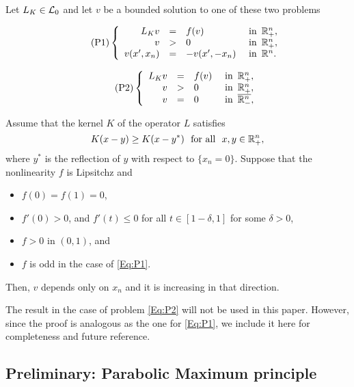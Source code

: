 \begin{theorem}
	\label{Th:SymmHalfSpace}
	Let $L_K\in \mathcal{L}_0$ and let $v$ be a bounded solution to one of these two problems
	
	\begin{equation}
	\leqnomode
	\tag{P1}
	\label{Eq:P1}
	\beqc{\PDEsystem}
	L_K v &=& f(v)   &\textrm{ in } \,\R^n_+,\\
	v &>& 0   &\textrm{ in } \,\R^n_+,\\
	v(x',x_n) &=& -v(x',-x_n)   &\textrm{ in } \,\R^n.
	\eeqc
	\end{equation}

	\begin{equation}
	\leqnomode
	\tag{P2}
	\label{Eq:P2}
	\beqc{\PDEsystem}
	L_K v &=& f(v)   &\textrm{ in } \,\R^n_+,\\
	v &>& 0   &\textrm{ in } \,\R^n_+,\\
	v &=& 0   &\textrm{ in } \,\overline{\R^n_-},
	\eeqc
	\end{equation}
	

	
	\reqnomode
	
	Assume that the kernel $K$ of the operator $L$ satisfies
	$$
	K(x-y) \geq K(x-y^*) \,\,\,\,\text{for all } \,\, x,y\in \mathbb{R}^n_+,
	$$ 
	where $y^*$ is the reflection of $y$ with respect to $\{x_n = 0\}$. Suppose that the nonlinearity $f$ is Lipsitchz and
	\begin{itemize}
		\item $f(0) = f(1) = 0$,
		\item $f'(0)>0$, and $f'(t)\leq 0$ for all $t\in[1-\delta,1]$ for some $\delta>0$,
		\item $f>0$ in $(0,1)$, and
		\item $f$ is odd in the case of \eqref{Eq:P1}.
	\end{itemize}
	Then, $v$ depends only on $x_n$ and it is increasing in that direction.
\end{theorem}


The result in the case of problem \eqref{Eq:P2} will not be used in this paper. However, since the
proof is analogous as the one for \eqref{Eq:P1}, we include it here for completeness and future reference.

\subsection{Preliminary: Parabolic Maximum principle}





